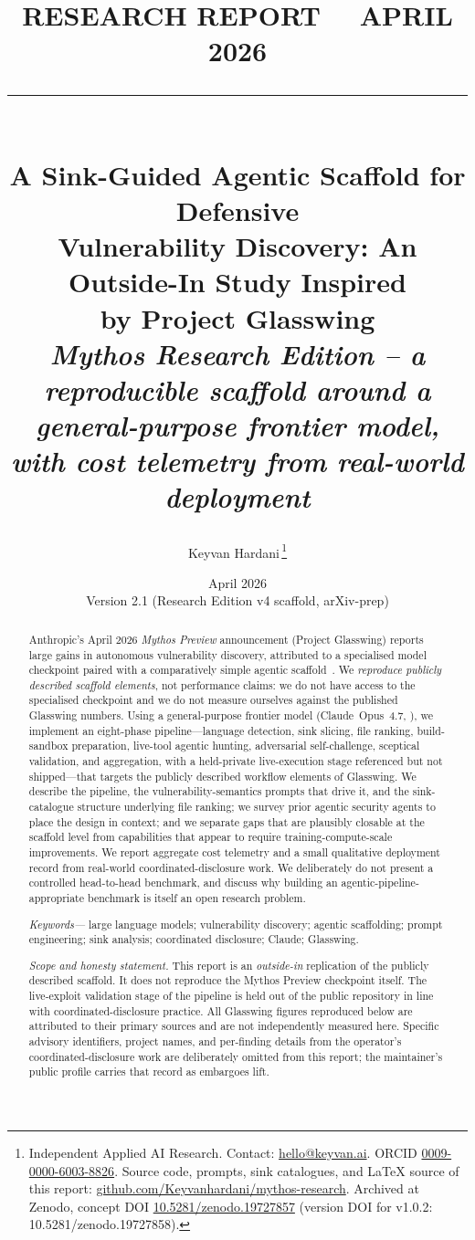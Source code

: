 \documentclass[11pt,a4paper]{article}
\title{\vspace{-1cm}
  \begin{flushleft}
  {\sffamily\footnotesize\textbf{RESEARCH REPORT \ \textperiodcentered\ APRIL 2026}}\\[-1pt]
  \rule{\textwidth}{0.4pt}\\[10pt]
  {\sffamily\Large\bfseries A Sink-Guided Agentic Scaffold for Defensive\\
  Vulnerability Discovery: An Outside-In Study Inspired\\ by Project Glasswing}\\[6pt]
  {\itshape\normalsize Mythos Research Edition -- a reproducible scaffold around a
  general-purpose frontier model, with cost telemetry from real-world deployment}
  \end{flushleft}
  \vspace{-0.4em}}
\author{%
  Keyvan Hardani\,\orcidlink{0009-0000-6003-8826}\thanks{%
    Independent Applied AI Research.
    Contact: \href{mailto:hello@keyvan.ai}{hello@keyvan.ai}.
    ORCID \href{https://orcid.org/0009-0000-6003-8826}{0009-0000-6003-8826}.
    Source code, prompts, sink catalogues, and LaTeX source of this report:
    \href{https://github.com/Keyvanhardani/mythos-research}{github.com/Keyvanhardani/mythos-research}.
    Archived at Zenodo, concept DOI \href{https://doi.org/10.5281/zenodo.19727857}{10.5281/zenodo.19727857}
    (version DOI for v1.0.2: 10.5281/zenodo.19727858).}
}
\date{April 2026 \\ \small Version 2.1 (Research Edition v4 scaffold, arXiv-prep)}
\begin{document}
\maketitle
\thispagestyle{plain}

\begin{abstract}
\noindent
Anthropic's April 2026 \emph{Mythos Preview} announcement (Project Glasswing)
reports large gains in autonomous vulnerability discovery, attributed to a
specialised model checkpoint paired with a comparatively simple agentic
scaffold~\citep{anthropicMythos2026}. We \emph{reproduce publicly described
scaffold elements}, not performance claims: we do not have access to the
specialised checkpoint and we do not measure ourselves against the published
Glasswing numbers. Using a general-purpose frontier model
(Claude~Opus~4.7, \citealt{anthropicOpus2026}), we implement an
eight-phase pipeline---language detection, sink slicing, file ranking,
build-sandbox preparation, live-tool agentic hunting, adversarial
self-challenge, sceptical validation, and aggregation, with a held-private
live-execution stage referenced but not shipped---that targets the
publicly described workflow elements of Glasswing. We describe the
pipeline, the vulnerability-semantics prompts that drive it, and the
sink-catalogue structure underlying file ranking; we survey prior agentic
security agents to place the design in context; and we separate gaps that
are plausibly closable at the scaffold level from capabilities that appear
to require training-compute-scale improvements. We report aggregate cost
telemetry and a small qualitative deployment record from real-world
coordinated-disclosure work. We deliberately do not present a controlled
head-to-head benchmark, and discuss why building an agentic-pipeline-
appropriate benchmark is itself an open research problem.

\vspace{0.6em}
\noindent\textit{Keywords---}%
large language models; vulnerability discovery; agentic scaffolding;
prompt engineering; sink analysis; coordinated disclosure; Claude; Glasswing.

\vspace{0.6em}
\noindent\textit{Scope and honesty statement.}%
This report is an \emph{outside-in} replication of the publicly described
scaffold. It does not reproduce the Mythos Preview checkpoint itself. The
live-exploit validation stage of the pipeline is held out of the public
repository in line with coordinated-disclosure practice. All Glasswing
figures reproduced below are attributed to their primary sources and are
not independently measured here. Specific advisory identifiers, project
names, and per-finding details from the operator's coordinated-disclosure
work are deliberately omitted from this report; the maintainer's public
profile carries that record as embargoes lift.
\end{abstract}
\end{document}
